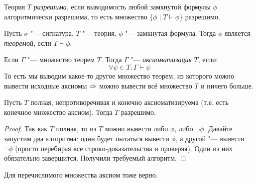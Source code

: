 \begin{Def}
	Теория $T$ \textit{разрешима}, если выводимость любой замкнутой формулы
	$\phi$ алгоритмически разрешима, то есть множество $\{ \phi \mid T \vdash \phi \}$ разрешимо.
\end{Def}

\begin{Def}
	Пусть $\sigma$ "--- сигнатура, $T$ "--- теория, $\phi$ "--- замкнутая формула.
	Тогда $\phi$ является \textit{теоремой}, если $T \vdash \phi$.
\end{Def}
\begin{Def}
	Если $\Gamma$ "--- множество теорем $T$.
	Тогда $\Gamma$ "--- \textit{аксиоматизация} $T$, если:
	\[ \forall \psi \in T \colon \Gamma \vdash \psi \]
	То есть мы выводим какое-то другое множество теорем, из которого можно
	вывести исходные аксиомы $\Rightarrow$ можно вывести всё множество $T$ и ничего больше.
\end{Def}

\begin{theorem}
	Пусть $T$ полная, непротиворечивая и конечно аксиоматизируема (т.е. есть
	конечное множество аксиом).
	Тогда $T$ разрешимо.
\end{theorem}
\begin{proof}
	Так как $T$ полная, то из $T$ можно вывести либо $\phi$, либо $\lnot \phi$.
	Давайте запустим два алгоритма: один будет пытаться вывести $\phi$, а
	другой "--- вывести $\lnot \phi$ (просто перебирая все строки-доказательства и проверяя).
	Один из них обязательно завершится.
	Получили требуемый алгоритм.
\end{proof}
\begin{Exercise}
	Для перечислимого множества аксиом тоже верно.
\end{Exercise}

